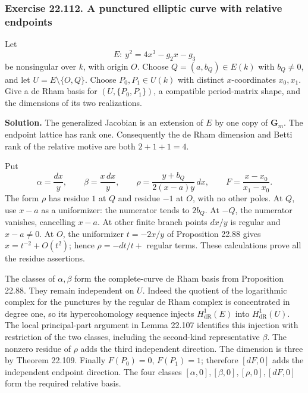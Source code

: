 \documentclass[
  11pt,
  a4paper,
]{article}
\begin{document}
\subsubsection{Exercise 22.112. A punctured elliptic curve with relative
endpoints}\label{exercise-22.112.-a-punctured-elliptic-curve-with-relative-endpoints}

Let \[
 E:\ y^2=4x^3-g_2x-g_3
\] be nonsingular over \(k\), with origin \(O\). Choose
\(Q=(a,b_Q)\in E(k)\) with \(b_Q\ne0\), and let \(U=E\setminus\{O,Q\}\).
Choose \(P_0,P_1\in U(k)\) with distinct \(x\)-coordinates \(x_0,x_1\).
Give a de Rham basis for \((U,\{P_0,P_1\})\), a compatible period-matrix
shape, and the dimensions of its two realizations.

\textbf{Solution.} The generalized Jacobian is an extension of \(E\) by
one copy of \(\mathbf G_m\). The endpoint lattice has rank one.
Consequently the de Rham dimension and Betti rank of the relative motive
are both \(2+1+1=4\).

Put \[
 \alpha=\frac{dx}{y},\qquad
 \beta=\frac{x\,dx}{y},\qquad
 \rho=\frac{y+b_Q}{2(x-a)y}\,dx,\qquad
 F=\frac{x-x_0}{x_1-x_0}.
 \tag{22.282}
\] The form \(\rho\) has residue \(1\) at \(Q\) and residue \(-1\) at
\(O\), with no other poles. At \(Q\), use \(x-a\) as a uniformizer: the
numerator tends to \(2b_Q\). At \(-Q\), the numerator vanishes,
cancelling \(x-a\). At other finite branch points \(dx/y\) is regular
and \(x-a\ne0\). At \(O\), the uniformizer \(t=-2x/y\) of Proposition
22.88 gives \(x=t^{-2}+O(t^2)\); hence \(\rho=-dt/t+\) regular terms.
These calculations prove all the residue assertions.

The classes of \(\alpha,\beta\) form the complete-curve de Rham basis
from Proposition 22.88. They remain independent on \(U\). Indeed the
quotient of the logarithmic complex for the punctures by the regular de
Rham complex is concentrated in degree one, so its hypercohomology
sequence injects \(H^1_{\mathrm{dR}}(E)\) into \(H^1_{\mathrm{dR}}(U)\).
The local principal-part argument in Lemma 22.107 identifies this
injection with restriction of the two classes, including the second-kind
representative \(\beta\). The nonzero residue of \(\rho\) adds the third
independent direction. The dimension is three by Theorem 22.109. Finally
\(F(P_0)=0\), \(F(P_1)=1\); therefore \([dF,0]\) adds the independent
endpoint direction. The four classes
\([\alpha,0],[\beta,0],[\rho,0],[dF,0]\) form the required relative
basis.
\end{document}
